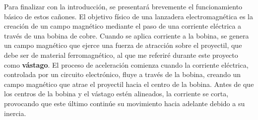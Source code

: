 Para finalizar con la introducción, se presentará brevemente el funcionamiento básico de estos cañones. El objetivo físico de una lanzadera electromagnética es la creación de un campo magnético mediante el paso de una corriente eléctrica a través de una bobina de cobre. Cuando se aplica corriente a la bobina, se genera un campo magnético que ejerce una fuerza de atracción sobre el proyectil, que debe ser de material ferromagnético, al que me referiré durante este proyecto como \textbf{vástago}. El proceso de aceleración comienza cuando la corriente eléctrica, controlada por un circuito electrónico, fluye a través de la bobina, creando un campo magnético que atrae el proyectil hacia el centro de la bobina. Antes de que los centros de la bobina y el vástago estén alineados, la corriente se corta, provocando que este último continúe su movimiento hacia adelante debido a su inercia.

\newpage